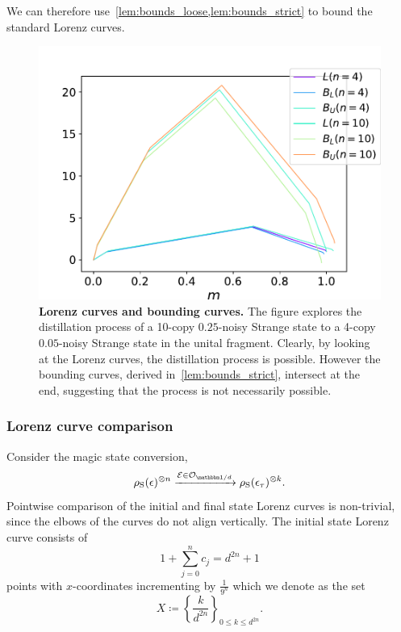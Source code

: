 \documentclass[pra,
aps,
twocolumn,
superscriptaddress,
groupedaddress,
nofootinbib,
reprint
]{revtex4-1}
\begin{document}
We can therefore use~\cref{lem:bounds_loose,lem:bounds_strict} to bound the standard Lorenz curves.
\begin{figure}[b]
    \centering
    \includegraphics[scale=0.4]{figs/lc_bounds.pdf}
    \caption{\textbf{Lorenz curves and bounding curves.} 
    The figure explores the distillation process of a 10-copy $0.25$-noisy Strange state to a 4-copy $0.05$-noisy Strange state in the unital fragment.
    Clearly, by looking at the Lorenz curves, the distillation process is possible.
    However the bounding curves, derived in~\cref{lem:bounds_strict}, intersect at the end, suggesting that the process is not necessarily possible.
    }
    \label{fig:lc_bounds}
\end{figure}

\subsubsection{Lorenz curve comparison}
Consider the magic state conversion,
\begin{equation}\label{eq:su_conversion}
	\noisysn \xrightarrow{\E \in \O_{\id/d}} \rho_{\rm{S}}(\epsilon_{\tau})^{\otimes k}.
\end{equation}
Pointwise comparison of the initial and final state Lorenz curves is non-trivial, since the elbows of the curves do not align vertically.
The initial state Lorenz curve consists of
\begin{equation}
	1 + \sum_{j=0}^{n} c_j = d^{2n} + 1
\end{equation}
points with $x$-coordinates incrementing by $\frac{1}{9^n}$ which we denote as the set 
\begin{equation}
X \coloneqq \left\{ \frac{k}{d^{2n}} \right\}_{0 \leq k \leq d^{2n}}.
\end{equation}
\end{document}
